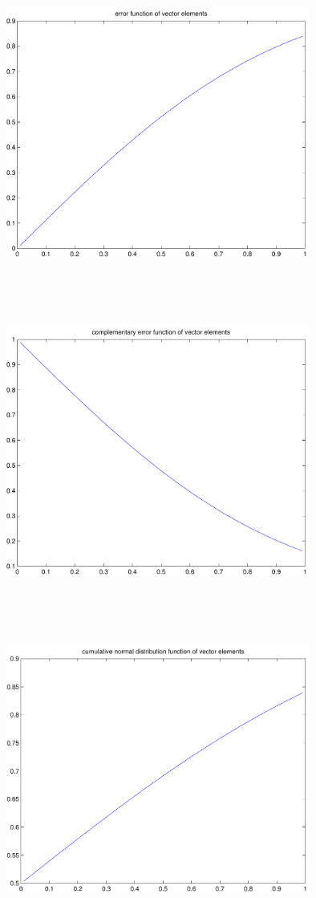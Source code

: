 \documentclass[9pt]{article}
\theoremstyle{plain}
\theoremstyle{definition}
\theoremstyle{remark}
\numberwithin{equation}{section}
\begin{document}
\includegraphics[width=10.0cm,height=10.0cm]{klVSLErf.pdf}

\includegraphics[width=10.0cm,height=10.0cm]{klVSLErfc.pdf}

\includegraphics[width=10.0cm,height=10.0cm]{klVSLCdfNorm.pdf}
\end{document}
